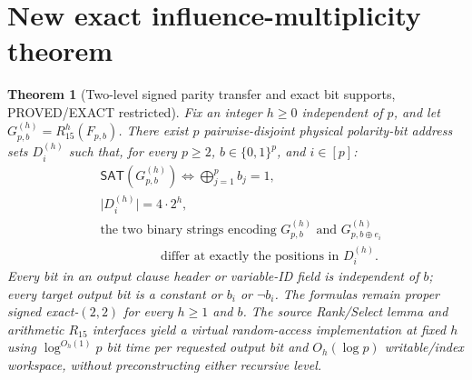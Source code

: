 \documentclass[11pt]{article}
\newtheorem{theorem}{Theorem}
\newcommand{\SAT}{\mathsf{SAT}}
\begin{document}
\section{New exact influence-multiplicity theorem}
\begin{theorem}[Two-level signed parity transfer and exact bit supports, PROVED/EXACT restricted]
Fix an integer $h\ge0$ independent of $p$, and let $G^{(h)}_{p,b}=R_{15}^{h}(F_{p,b})$. There exist $p$ pairwise-disjoint \emph{physical polarity-bit address sets} $D_i^{(h)}$ such that, for every $p\ge2$, $b\in\{0,1\}^p$, and $i\in[p]$:
\begin{align}
 &\SAT(G^{(h)}_{p,b})\iff\bigoplus_{j=1}^p b_j=1,\\
 &\bigl|D_i^{(h)}\bigr|=4\cdot2^h,\\
 &\text{the two binary strings encoding }G^{(h)}_{p,b}\text{ and }G^{(h)}_{p,b\oplus e_i}\nonumber\\
 &\hspace{2cm}\text{differ at exactly the positions in }D_i^{(h)}.
\end{align}
Every bit in an output clause header or variable-ID field is independent of $b$; every target output bit is a constant or $b_i$ or $\neg b_i$. The formulas remain proper signed exact-$(2,2)$ for every $h\ge1$ and $b$. The source Rank/Select lemma and arithmetic $R_{15}$ interfaces yield a virtual random-access implementation at fixed $h$ using $\log^{O_h(1)}p$ bit time per requested output bit and $O_h(\log p)$ writable/index workspace, without preconstructing either recursive level.
\end{theorem}
\end{document}
